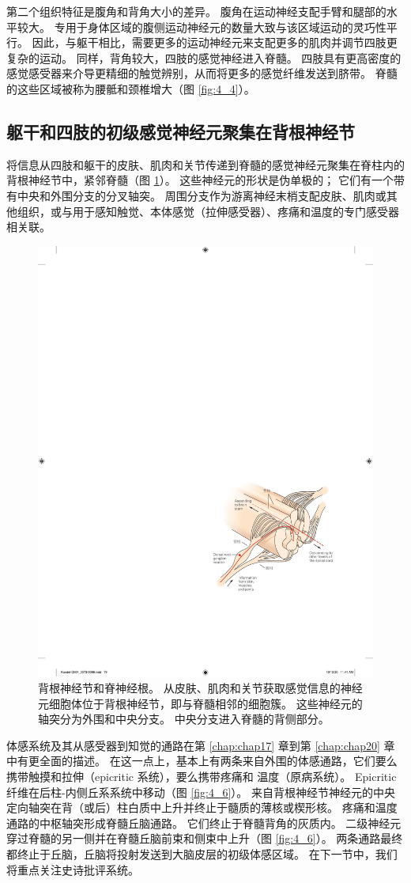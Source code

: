 第二个组织特征是腹角和背角大小的差异。 
腹角在运动神经支配手臂和腿部的水平较大。 
专用于身体区域的腹侧运动神经元的数量大致与该区域运动的灵巧性平行。 
因此，与躯干相比，需要更多的运动神经元来支配更多的肌肉并调节四肢更复杂的运动。 
同样，背角较大，四肢的感觉神经进入脊髓。 
四肢具有更高密度的感觉感受器来介导更精细的触觉辨别，从而将更多的感觉纤维发送到脐带。 
脊髓的这些区域被称为腰骶和颈椎增大（图 \ref{fig:4_4}）。


\subsection{躯干和四肢的初级感觉神经元聚集在背根神经节}
将信息从四肢和躯干的皮肤、肌肉和关节传递到脊髓的感觉神经元聚集在脊柱内的背根神经节中，紧邻脊髓（图 \ref{fig:4_5}）。 
这些神经元的形状是伪单极的； 它们有一个带有中央和外围分支的分叉轴突。 
周围分支作为游离神经末梢支配皮肤、肌肉或其他组织，或与用于感知触觉、本体感觉（拉伸感受器）、疼痛和温度的专门感受器相关联。

\begin{figure}[htbp]
	\centering
	\includegraphics[width=0.5\linewidth]{chap04/fig_4_5}
	\caption{背根神经节和脊神经根。 
		从皮肤、肌肉和关节获取感觉信息的神经元细胞体位于背根神经节，即与脊髓相邻的细胞簇。 
		这些神经元的轴突分为外围和中央分支。 
		中央分支进入脊髓的背侧部分。}
	\label{fig:4_5}
\end{figure}


体感系统及其从感受器到知觉的通路在第 \ref{chap:chap17} 章到第 \ref{chap:chap20} 章中有更全面的描述。
在这一点上，基本上有两条来自外围的体感通路，它们要么携带触摸和拉伸（epicritic 系统），要么携带疼痛和 温度（原病系统）。 
Epicritic 纤维在后柱-内侧丘系系统中移动（图 \ref{fig:4_6}）。 
来自背根神经节神经元的中央定向轴突在背（或后）柱白质中上升并终止于髓质的薄核或楔形核。 
疼痛和温度通路的中枢轴突形成脊髓丘脑通路。 
它们终止于脊髓背角的灰质内。 
二级神经元穿过脊髓的另一侧并在脊髓丘脑前束和侧束中上升（图 \ref{fig:4_6}）。 
两条通路最终都终止于丘脑，丘脑将投射发送到大脑皮层的初级体感区域。 
在下一节中，我们将重点关注史诗批评系统。

